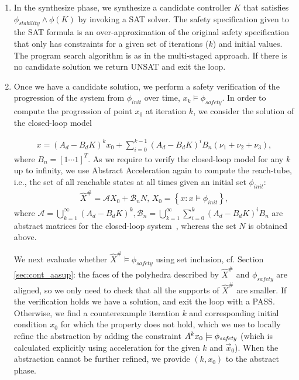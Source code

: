 \begin{enumerate}
\begin{enumerate}
\end{enumerate}
\item In the {\sc synthesize} phase, we synthesize a candidate controller
  $K$ 
  that satisfies
  $\phi_\mathit{stability} \wedge \phi (K)$ by invoking a SAT solver.  
  The safety specification given to the SAT formula is an over-approximation of the original safety specification that only has constraints for a given set of iterations ($k$) and initial values.  
 The program search algorithm is as in the multi-staged approach.  
If there is no candidate solution we return UNSAT and exit the loop. 
\item Once we have a candidate solution, we perform a safety verification 
  of the 
  progression of the system from $\phi_\mathit{init}$ over time,
$x_{k} \models \phi_\mathit{safety}$. 
  In order to compute the progression of point $x_0$ at iteration $k$,
  we consider the solution of the closed-loop model 

{
\scriptsize
\begin{align*}
x=(A_d-B_dK)^kx_0+ \sum_{i=0}^{k-1} (A_d-B_dK)^i B_{n}(\nu_1+\nu_2+\nu_3), 
\end{align*}
}
where $B_n= [1 \cdots 1]^T$. 
As we require to verify the closed-loop model for any $k$ up to infinity, 
we use Abstract Acceleration again to compute the reach-tube, 
i.e., the set of all reachable states at all times given an initial set
$\phi_\mathit{init}$:
%
\begin{align}
\label{eq:aa_observer_LTI_cf}
\hat{X}^\#
=\mathcal{A} X_0 + \mathcal{B}_{n} N, \,
X_0 =\left \{x: x \models \phi_\mathit{init} \right\}, 
\end{align} 
%
where $\mathcal{A}=\bigcup_{k=1}^\infty (A_d-B_dK)^k,
\mathcal{B}_{n}=\bigcup_{k=1}^\infty \sum_{i=0}^k(A_d-B_dK)^iB_{n}$ are
abstract matrices for the closed-loop system~\cite{cattaruzza2015unbounded},
whereas the set $N$ is obtained above. 


We next evaluate whether $\hat{X}^\# \models \phi_\mathit{safety}$ using set inclusion, cf. Section \ref{sec:cont_aasup}: 
the faces of the polyhedra described by $\hat{X}^\#$ and $\phi_\mathit{safety}$ are aligned, so we only need to check that all the supports of $\hat{X}^\#$ are smaller.   
If the verification holds we have a solution, and exit the loop with a PASS.  Otherwise, we
find a counterexample iteration $k$ and corresponding initial condition $x_0$
for which the property does not hold, which we use to locally refine the
abstraction by adding the constraint ${A}^k{x}_0 \models \phi_\mathit{safety}$ (which is calculated explicitly using acceleration for the given $k$ and $\vec{x}_0$).  
When the abstraction cannot be further refined, we provide $(k, x_0)$ to the {\sc abstract} phase.


\end{enumerate}
